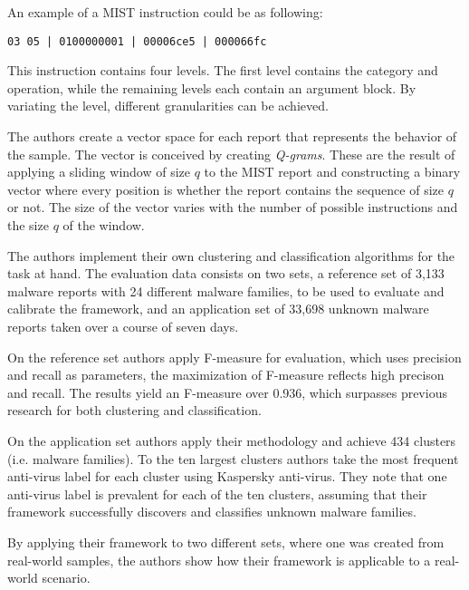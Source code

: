 
An example of a MIST instruction could be as following:

\begin{center}\texttt{03 05 | 0100000001 | 00006ce5 | 000066fc}\end{center}

This instruction contains four levels. The first level contains the category and operation, while the remaining levels each contain an argument block. By variating the level, different granularities can be achieved.

The authors create a vector space for each report that represents the behavior of the sample. The vector is conceived by creating \textit{Q-grams}. These are the result of applying a sliding window of size $q$ to the MIST report and constructing a binary vector where every position is whether the report contains the sequence of size $q$ or not. The size of the vector varies with the number of possible instructions and the size $q$ of the window.

The authors implement their own clustering and classification algorithms for the task at hand. The evaluation data consists on two sets, a reference set of 3,133 malware reports with 24 different malware families, to be used to evaluate and calibrate the framework, and an application set of 33,698 unknown malware reports taken over a course of seven days.

On the reference set authors apply F-measure for evaluation, which uses precision and recall as parameters, the maximization of F-measure reflects high precison and recall. The results yield an F-measure over 0.936, which surpasses previous research for both clustering and classification.

On the application set authors apply their methodology and achieve 434 clusters (i.e. malware families). To the ten largest clusters authors take the most frequent anti-virus label for each cluster using Kaspersky anti-virus. They note that one anti-virus label is prevalent for each of the ten clusters, assuming that their framework successfully discovers and classifies unknown malware families.

By applying their framework to two different sets, where one was created from real-world samples, the authors show how their framework is applicable to a real-world scenario.

